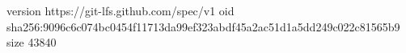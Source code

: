 version https://git-lfs.github.com/spec/v1
oid sha256:9096c6c074bc0454f11713da99ef323abdf45a2ac51d1a5dd249c022c81565b9
size 43840
